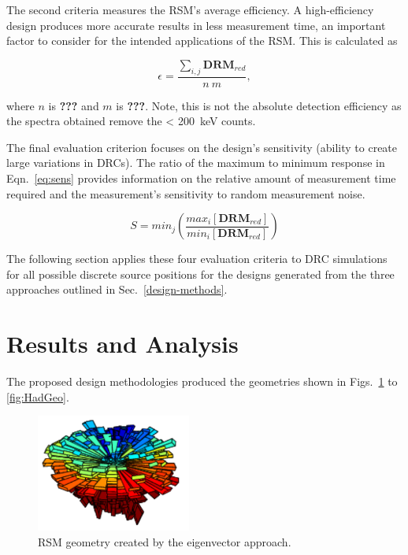 \documentclass[3p,times]{elsarticle}
\begin{document}
The second criteria measures the RSM's average efficiency.  
A high-efficiency design produces more accurate results in less measurement time, an important factor to consider for the intended applications of the RSM.  
This is calculated as 

\begin{equation}
\epsilon=\frac{\sum_{i,j}\mathbf{DRM}_{red}}{n\ m},
\label{eq:avgcell}
\end{equation}

\noindent where $n$ is \textbf{???} and $m$ is \textbf{???}.
Note, this is not the absolute detection efficiency as the spectra obtained remove the < 200~keV counts.

The final evaluation criterion focuses on the design's sensitivity (ability to create large variations in DRCs).  
The ratio of the maximum to minimum response in Eqn.~\ref{eq:sens} provides information on the relative amount of measurement time required and the measurement's sensitivity to random measurement noise. 

\begin{equation}
S=min_{j}\left(\frac{max_{i} \left[\mathbf{DRM}_{red}\right]}{min_{i} \left[\mathbf{DRM}_{red}\right]}\right)
\label{eq:sens}
\end{equation}

The following section applies these four evaluation criteria to DRC simulations for all possible discrete source positions for the designs generated from the three approaches outlined in Sec.~\ref{design-methods}.

\section{Results and Analysis}
The proposed design methodologies produced the geometries shown in Figs.~\ref{fig:EVGeo} to \ref{fig:HadGeo}.

\begin{figure}[ht!]
\centering
\includegraphics[width={2.0in}]{../figs/EVGeo.pdf}
\caption{RSM geometry created by the eigenvector approach.}
\label{fig:EVGeo}
\end{figure}
\end{document}
